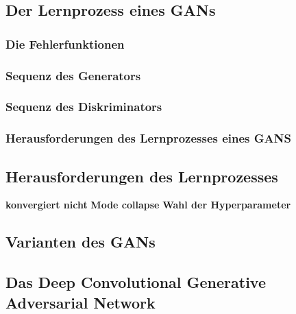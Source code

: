 \subsection{Der Lernprozess eines GANs}

	\subsubsection{Die Fehlerfunktionen} \label{loss-function}
	
	\subsubsection{Sequenz des Generators}
	
	\subsubsection{Sequenz des Diskriminators}
	
	\subsubsection{Herausforderungen des Lernprozesses eines GANS}

\subsection{Herausforderungen des Lernprozesses}
\textbf{konvergiert nicht}
\textbf{Mode collapse}
\textbf{Wahl der Hyperparameter}
\subsection{Varianten des GANs}
\subsection{Das Deep Convolutional Generative Adversarial Network}

